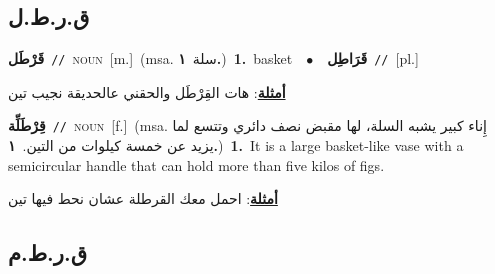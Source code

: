 \documentclass[10pt,a4paper,twoside]{article} %
\begin{document}
\begin{multicols}{2}
\vspace{-3mm}
\subsection*{\color{blue}\foreignlanguage{arabic}{ق.ر.ط.ل}\color{blue}{}} 

{\setlength\topsep{0pt}\textbf{\foreignlanguage{arabic}{قَرْطَل}}\ {\color{gray}\texttt{//}\color{black}}\ \textsc{noun}\ [m.]\ \color{gray}(msa. \foreignlanguage{arabic}{سلة}~\foreignlanguage{arabic}{\textbf{١.}})\color{black}\ \textbf{1.}~basket\ \ $\bullet$\ \ \setlength\topsep{0pt}\textbf{\foreignlanguage{arabic}{قَرَاطِل}}\ {\color{gray}\texttt{//}\color{black}}\ [pl.]\  \begin{flushright}\color{gray}\foreignlanguage{arabic}{\textbf{\underline{\foreignlanguage{arabic}{أمثلة}}}: هات القِرْطَل والحقني عالحديقة نجيب تين}\end{flushright}\color{black}} \vspace{2mm}

{\setlength\topsep{0pt}\textbf{\foreignlanguage{arabic}{قِرْطَلِّة}}\ {\color{gray}\texttt{//}\color{black}}\ \textsc{noun}\ [f.]\ \color{gray}(msa. \foreignlanguage{arabic}{إِناء كبير يشبه السلة، لها مقبض نصف دائري وتتسع لما يزيد عن خمسة كيلوات من التين.}~\foreignlanguage{arabic}{\textbf{١.}})\color{black}\ \textbf{1.}~It is a large basket-like vase with a semicircular handle that can hold more than five kilos of figs.\  \begin{flushright}\color{gray}\foreignlanguage{arabic}{\textbf{\underline{\foreignlanguage{arabic}{أمثلة}}}: احمل معك القرطلة عشان نحط فيها تين}\end{flushright}\color{black}} \vspace{2mm}

\vspace{-3mm}
\subsection*{\color{blue}\foreignlanguage{arabic}{ق.ر.ط.م}\color{blue}{}} 


\end{multicols}
\end{document}
